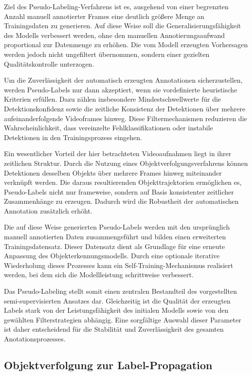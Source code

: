 Ziel des Pseudo-Labeling-Verfahrens ist es, ausgehend von einer begrenzten Anzahl 
manuell annotierter Frames eine deutlich größere Menge an Trainingsdaten zu 
generieren. Auf diese Weise soll die Generalisierungsfähigkeit des Modells verbessert 
werden, ohne den manuellen Annotierungsaufwand proportional zur Datenmenge zu erhöhen. 
Die vom Modell erzeugten Vorhersagen werden jedoch nicht ungefiltert übernommen, 
sondern einer gezielten Qualitätskontrolle unterzogen.

Um die Zuverlässigkeit der automatisch erzeugten Annotationen sicherzustellen, 
werden Pseudo-Labels nur dann akzeptiert, wenn sie vordefinierte heuristische 
Kriterien erfüllen. Dazu zählen insbesondere Mindestschwellwerte für die 
Detektionskonfidenz sowie die zeitliche Konsistenz der Detektionen über mehrere 
aufeinanderfolgende Videoframes hinweg. Diese Filtermechanismen reduzieren die 
Wahrscheinlichkeit, dass vereinzelte Fehlklassifikationen oder instabile Detektionen 
in den Trainingsprozess eingehen.

Ein wesentlicher Vorteil der hier betrachteten Videoaufnahmen liegt in ihrer 
zeitlichen Struktur. Durch die Nutzung eines Objektverfolgungsverfahrens können 
Detektionen desselben Objekts über mehrere Frames hinweg miteinander verknüpft werden. 
Die daraus resultierenden Objekttrajektorien ermöglichen es, Pseudo-Labels nicht nur 
frameweise, sondern auf Basis konsistenter zeitlicher Zusammenhänge zu erzeugen. 
Dadurch wird die Robustheit der automatischen Annotation zusätzlich erhöht.

Die auf diese Weise generierten Pseudo-Labels werden mit den ursprünglich manuell 
annotierten Daten zusammengeführt und bilden einen erweiterten Trainingsdatensatz. 
Dieser Datensatz dient als Grundlage für eine erneute Anpassung des 
Objekterkennungsmodells. Durch eine optionale iterative Wiederholung dieses Prozesses 
kann ein Self-Training-Mechanismus realisiert werden, bei dem sich die Modellleistung 
schrittweise verbessert.

Das Pseudo-Labeling stellt somit einen zentralen Bestandteil des vorgestellten 
semi-supervisierten Ansatzes dar. Gleichzeitig ist die Qualität der erzeugten Labels 
stark von der Leistungsfähigkeit des initialen Modells sowie von den gewählten 
Filterstrategien abhängig. Eine sorgfältige Auswahl dieser Parameter ist daher 
entscheidend für die Stabilität und Zuverlässigkeit des gesamten 
Anotationsprozesses.

\subsection{Objektverfolgung zur Label-Propagation}

